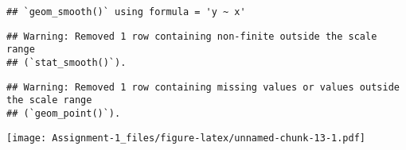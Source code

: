 \documentclass[
]{article}
\begin{document}
\begin{verbatim}
## `geom_smooth()` using formula = 'y ~ x'
\end{verbatim}

\begin{verbatim}
## Warning: Removed 1 row containing non-finite outside the scale range
## (`stat_smooth()`).
\end{verbatim}

\begin{verbatim}
## Warning: Removed 1 row containing missing values or values outside the scale range
## (`geom_point()`).
\end{verbatim}

\texttt{[image: Assignment-1\_files/figure-latex/unnamed-chunk-13-1.pdf]}
\end{document}
